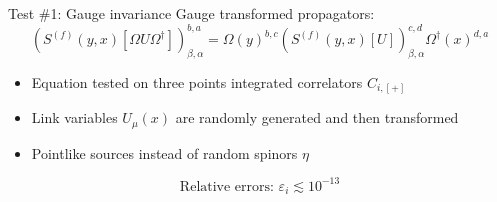 \documentclass{beamer}
\begin{document}
\begin{frame}{Test \#1: Gauge invariance}
      Gauge transformed propagators:\newline
      \begin{equation*}
            \left(S^{(f)}(y, x)[\Omega U \Omega^\dagger]\right)^{b,a}_{\beta,\alpha} = \Omega (y)^{b,c} \left(S^{(f)}(y,x)[U]\right)^{c,d}_{\beta,\alpha} \Omega^\dagger (x)^{d,a}
      \end{equation*}
      \begin{itemize}
            \item Equation tested on three points integrated correlators $C_{i,[+]}$
            \item Link variables $U_\mu (x)$ are randomly generated and then transformed
            \item Pointlike sources instead of random spinors $\eta$
      \end{itemize}
      \begin{equation*}
            \text{Relative errors: } \varepsilon_i \lesssim 10^{-13}
      \end{equation*}
\end{frame}
\end{document}
